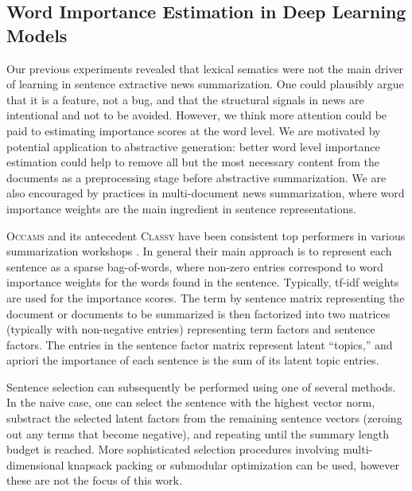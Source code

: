 \subsection{Word Importance Estimation in Deep Learning Models}



Our previous experiments revealed that lexical sematics were not the 
main driver of learning in sentence extractive news summarization. 
One could plausibly argue that it is a feature, not a bug, and that 
the structural
signals in news are intentional and not to be avoided. However, we think more 
attention could be paid to estimating importance scores at the word level.
We are motivated by potential application to abstractive generation: better
word level importance estimation could help to remove all but the most 
necessary content from the documents as a preprocessing stage before
abstractive summarization. We are also encouraged by practices
in multi-document news summarization, where word importance weights 
are the main ingredient in sentence representations. 


\newcommand{\classy}{\textsc{Classy}}
\newcommand{\occams}{\textsc{Occams}}


\occams{} and its antecedent \classy{} have been consistent top performers in various
summarization workshops \citep{conroyback,conroyclassy,davis2012occams}. 
In general their main approach 
is to represent each sentence as a sparse bag-of-words, where non-zero
entries correspond to word importance weights for the words found in the 
sentence. Typically, tf-idf weights are used for the importance scores.
The term by sentence matrix representing the document or documents to be
summarized is then factorized into two  matrices (typically with
non-negative entries) representing term factors and sentence factors.
The entries in the sentence factor matrix represent latent ``topics,'' 
and apriori the importance of each sentence is the sum of its latent topic
entries.

Sentence selection can subsequently be performed using one of several methods.
In the naive case, one can select the sentence with the highest vector norm, 
substract the selected latent factors from the remaining sentence vectors
(zeroing out any terms that become negative), and repeating until the
summary length budget is reached. More sophisticated selection procedures
involving multi-dimensional knapsack packing or submodular optimization 
can be used, however these are not the focus of this work.

